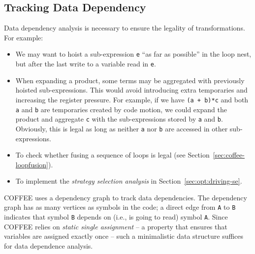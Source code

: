 %


\subsection{Tracking Data Dependency}
Data dependency analysis is necessary to ensure the legality of transformations. For example:
\begin{itemize}
\item We may want to hoist a sub-expression \texttt{e} ``as far as possible'' in the loop nest, but after the last write to a variable read in \texttt{e}.
\item When expanding a product, some terms may be aggregated with previously hoisted sub-expressions. This would avoid introducing extra temporaries and increasing the register pressure. For example, if we have \texttt{(a + b)*c} and both \texttt{a} and \texttt{b} are temporaries created by code motion, we could expand the product and aggregate \texttt{c} with the sub-expressions stored by \texttt{a} and \texttt{b}. Obviously, this is legal as long as neither \texttt{a} nor \texttt{b} are accessed in other sub-expressions.
\item To check whether fusing a sequence of loops is legal (see Section~\ref{sec:coffee-loopfusion}).
\item To implement the {\em strategy selection analysis} in Section~\ref{sec:opt:driving-se}.
\end{itemize}

COFFEE uses a dependency graph to track data dependencies. The dependency graph has as many vertices as symbols in the code; a direct edge from \texttt{A} to \texttt{B} indicates that symbol \texttt{B} depends on (i.e., is going to read) symbol \texttt{A}. Since COFFEE relies on \textit{static single assignment} -- a property that ensures that variables are assigned exactly once -- such a minimalistic data structure suffices for data dependence analysis.

